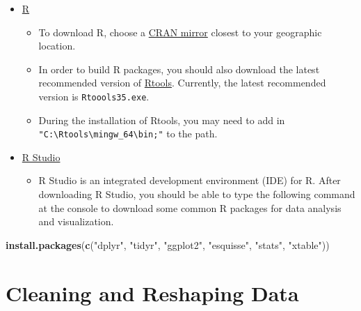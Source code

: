 \documentclass[]{book}
\newenvironment{Shaded}{\begin{snugshade}}{\end{snugshade}}
\newcommand{\KeywordTok}[1]{\textcolor[rgb]{0.13,0.29,0.53}{\textbf{#1}}}
\newcommand{\NormalTok}[1]{#1}
\newcommand{\StringTok}[1]{\textcolor[rgb]{0.31,0.60,0.02}{#1}}
\providecommand{\tightlist}{%
  \setlength{\itemsep}{0pt}\setlength{\parskip}{0pt}}
\begin{document}
\begin{itemize}
\item
  \href{https://www.r-project.org/}{R}

  \begin{itemize}
  \tightlist
  \item
    To download R, choose a \href{https://cran.r-project.org/mirrors.html}{CRAN mirror} closest to your geographic location.
  \item
    In order to build R packages, you should also download the latest recommended version of \href{https://cran.r-project.org/bin/windows/Rtools/}{Rtools}. Currently, the latest recommended version is \texttt{Rtoools35.exe}.
  \item
    During the installation of Rtools, you may need to add in \texttt{"C:\textbackslash{}Rtools\textbackslash{}mingw\_64\textbackslash{}bin;"} to the path.
  \end{itemize}
\item
  \href{https://www.rstudio.com/products/rstudio/download/\#download}{R Studio}

  \begin{itemize}
  \tightlist
  \item
    R Studio is an integrated development environment (IDE) for R. After downloading R Studio, you should be able to type the following command at the console to download some common R packages for data analysis and visualization.
  \end{itemize}
\end{itemize}

\begin{Shaded}
\begin{Highlighting}[]
\KeywordTok{install.packages}\NormalTok{(}\KeywordTok{c}\NormalTok{(}\StringTok{"dplyr"}\NormalTok{, }\StringTok{"tidyr"}\NormalTok{, }\StringTok{"ggplot2"}\NormalTok{, }\StringTok{"esquisse"}\NormalTok{, }\StringTok{"stats"}\NormalTok{, }\StringTok{"xtable"}\NormalTok{))}
\end{Highlighting}
\end{Shaded}

\hypertarget{cleaning-and-reshaping-data}{%
\section{Cleaning and Reshaping Data}\label{cleaning-and-reshaping-data}}
\end{document}
